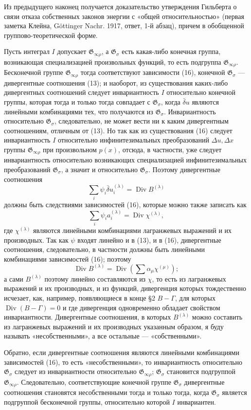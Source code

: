 \documentclass[11pt]{article}
\providecommand{\G}{\mathfrak G}
\providecommand{\D}{\Delta}
\DeclareMathOperator{\Div}{Div}
\providecommand{\bd}{\bar{\delta}}
\begin{document}
Из предыдущего наконец получается доказательство утверждения Гильберта о связи отказа собственных законов энергии с «общей относительностью» (первая заметка Клейна, Göttinger Nachr. 1917, ответ, 1-й абзац), причем в обобщенной группово-теоретической форме.

Пусть интеграл \(I\) допускает \(\G_{\infty\rho}\), а \(\G_\sigma\) есть какая-либо конечная группа, возникающая специализацией произвольных функций, то есть подгруппа \(\G_{\infty\rho}\). Бесконечной группе \(\G_{\infty\rho}\) тогда соответствуют зависимости (16), конечной \(\G_\sigma\) --- дивергентные соотношения (13); и наоборот, из существования каких-либо дивергентных соотношений следует инвариантность \(I\) относительно конечной группы, которая тогда и только тогда совпадает с \(\G_\sigma\), когда \(\bd u\) являются линейными комбинациями тех, что получаются из \(\G_\sigma\). Инвариантность относительно \(\G_\sigma\), следовательно, не может вести ни к каким дивергентным соотношениям, отличным от (13). Но так как из существования (16) следует инвариантность \(I\) относительно инфинитезимальных преобразований \(\D u,\D x\) группы \(\G_{\infty\rho}\) при произвольном \(p(x)\), отсюда, в частности, уже следует инвариантность относительно возникающих специализацией инфинитезимальных преобразований \(\G_\sigma\), а значит и относительно \(\G_\sigma\). Поэтому дивергентные соотношения
\[
\sum_i\psi_i\bd u_i^{(\lambda)}=\Div B^{(\lambda)}
\]
должны быть следствиями зависимостей (16), которые можно также записать как
\[
\sum_i\psi_i a_i^{(\lambda)}=\Div\chi^{(\lambda)},
\]
где \(\chi^{(\lambda)}\) являются линейными комбинациями лагранжевых выражений и их производных. Так как \(\psi\) входят линейно и в (13), и в (16), дивергентные соотношения, следовательно, в частности должны быть линейными комбинациями зависимостей (16); поэтому
\[
\Div B^{(\lambda)}=\Div\left(\sum \alpha_\mu\chi^{(\mu)}\right);
\]
а сами \(B^{(\lambda)}\) поэтому линейно составляются из \(\chi\), то есть из лагранжевых выражений и их производных, и из функций, дивергенция которых тождественно исчезает, как, например, появляющиеся в конце \S{}2 \(B-\Gamma\), для которых \(\Div(B-\Gamma)=0\) и где дивергенция одновременно обладает свойством инвариантности. Дивергентные соотношения, в которых \(B^{(\lambda)}\) можно составить из лагранжевых выражений и их производных указанным образом, я буду называть «несобственными», а все остальные --- «собственными».

Обратно, если дивергентные соотношения являются линейными комбинациями зависимостей (16), то есть «несобственными», то инвариантность относительно \(\G_\sigma\) следует из инвариантности относительно \(\G_{\infty\rho}\); \(\G_\sigma\) становится подгруппой \(\G_{\infty\rho}\). Следовательно, соответствующие конечной группе \(\G_\sigma\) дивергентные соотношения становятся несобственными тогда и только тогда, когда \(\G_\sigma\) является подгруппой бесконечной группы, относительно которой \(I\) инвариантен.
\end{document}
